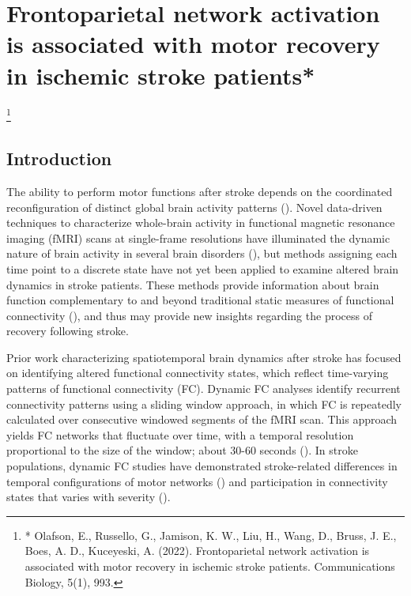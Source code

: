 \documentclass[phd,tocprelim]{cornell}
\newcommand\blfootnote[1]{%
  \begingroup
  \renewcommand\thefootnote{}\footnote{#1}%
  \addtocounter{footnote}{-1}%
  \endgroup
}
\begin{document}
\label{chap:1}

\chapter{Frontoparietal network activation is associated with motor recovery in ischemic stroke patients*}
\blfootnote{* Olafson, E., Russello, G., Jamison, K. W., Liu, H., Wang, D., Bruss, J. E., Boes, A. D.,  Kuceyeski, A. (2022). Frontoparietal network activation is associated with motor recovery in ischemic stroke patients. Communications Biology, 5(1), 993.}
\section{Introduction}
	The ability to perform motor functions after stroke depends on the coordinated reconfiguration of distinct global brain activity patterns (\cite{Park2011-kx}). Novel data-driven techniques to characterize whole-brain activity in functional magnetic resonance imaging (fMRI) scans at single-frame resolutions have illuminated the dynamic nature of brain activity in several brain disorders (\cite{ Braun2021-iy, Adhikari2020-tk, Kaiser2019-rf,  Parker_Singleton-ur}), but methods assigning each time point to a discrete state have not yet been applied to examine altered brain dynamics in stroke patients. These methods provide information about brain function complementary to and beyond traditional static measures of functional connectivity (\cite{Cornblath2020-nc}), and thus may provide new insights regarding the process of recovery following stroke.
	
	Prior work characterizing spatiotemporal brain dynamics after stroke has focused on identifying altered functional connectivity states, which reflect time-varying patterns of functional connectivity (FC). Dynamic FC analyses identify recurrent connectivity patterns using a sliding window approach, in which FC is repeatedly calculated over consecutive windowed segments of the fMRI scan. This approach yields FC networks that fluctuate over time, with a temporal resolution proportional to the size of the window; about 30-60 seconds (\cite{Savva2019-hk}). In stroke populations, dynamic FC studies have demonstrated stroke-related differences in temporal configurations of motor networks (\cite{Bonkhoff2020-bx}) and participation in connectivity states that varies with severity (\cite{Bonkhoff2020-de}). 
	
\end{document}
